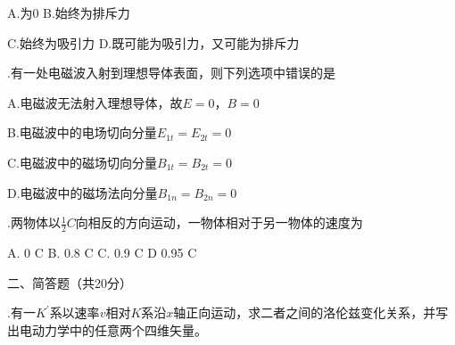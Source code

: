 A.\hspace{0.8em}为0 \hspace{8.9em}
B.\hspace{0.8em}始终为排斥力\vspace{0.2cm}

C.\hspace{0.8em}始终为吸引力\hspace{5em}
D.\hspace{0.8em}既可能为吸引力，又可能为排斥力\vspace{0.5cm}

.\hspace{0.8em}有一处电磁波入射到理想导体表面，则下列选项中错误的是\vspace{0.3cm}

A.\hspace{0.8em}电磁波无法射入理想导体，故$E = 0$，$B = 0$\vspace{0.2cm}

B.\hspace{0.8em}电磁波中的电场切向分量$E_{1t} = E_{2t} = 0$\vspace{0.2cm}

C.\hspace{0.8em}电磁波中的磁场切向分量$B_{1t} = B_{2t} = 0$\vspace{0.2cm}

D.\hspace{0.8em}电磁波中的磁场法向分量$B_{1n} = B_{2n} = 0$\vspace{0.5cm}

.\hspace{0.8em}两物体以$\displaystyle{ \frac{1}{2}C }$向相反的方向运动，一物体相对于另一物体的速度为\vspace{0.3cm}

A.\hspace{0.8em} 0 C \hspace{1em} B.\hspace{0.8em} 0.8 C \hspace{1em} C.\hspace{0.8em} 0.9 C \hspace{1em} D\hspace{0.8em} 0.95 C
\vspace{1cm}

\noindent
二、简答题（共20分）
\vspace{0.2cm}

.\hspace{0.8em}有一$K^{'}$系以速率$v$相对$K$系沿$x$轴正向运动，求二者之间的洛伦兹变化关系，并写出电动力学中的任意两个四维矢量。\vspace{0.5cm}


